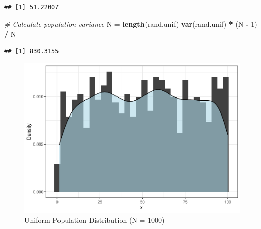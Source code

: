 \documentclass[]{book}
\newenvironment{Shaded}{\begin{snugshade}}{\end{snugshade}}
\newcommand{\CommentTok}[1]{\textcolor[rgb]{0.56,0.35,0.01}{\textit{#1}}}
\newcommand{\DataTypeTok}[1]{\textcolor[rgb]{0.13,0.29,0.53}{#1}}
\newcommand{\DecValTok}[1]{\textcolor[rgb]{0.00,0.00,0.81}{#1}}
\newcommand{\FloatTok}[1]{\textcolor[rgb]{0.00,0.00,0.81}{#1}}
\newcommand{\KeywordTok}[1]{\textcolor[rgb]{0.13,0.29,0.53}{\textbf{#1}}}
\newcommand{\NormalTok}[1]{#1}
\newcommand{\OperatorTok}[1]{\textcolor[rgb]{0.81,0.36,0.00}{\textbf{#1}}}
\newcommand{\StringTok}[1]{\textcolor[rgb]{0.31,0.60,0.02}{#1}}
\begin{document}
\begin{verbatim}
## [1] 51.22007
\end{verbatim}

\begin{Shaded}
\begin{Highlighting}[]
\CommentTok{# Calculate population variance}
\NormalTok{N =}\StringTok{ }\KeywordTok{length}\NormalTok{(rand.unif)}
\KeywordTok{var}\NormalTok{(rand.unif) }\OperatorTok{*}\StringTok{ }\NormalTok{(N }\OperatorTok{-}\StringTok{ }\DecValTok{1}\NormalTok{) }\OperatorTok{/}\StringTok{ }\NormalTok{N}
\end{Highlighting}
\end{Shaded}

\begin{verbatim}
## [1] 830.3155
\end{verbatim}

\begin{Shaded}
\end{Shaded}

\begin{figure}

{\centering \includegraphics{People_Analytics_Lifecycle_files/figure-latex/unnamed-chunk-41-1} 

}

\caption{Uniform Population Distribution (N = 1000)}\label{fig:unnamed-chunk-41}
\end{figure}
\end{document}
